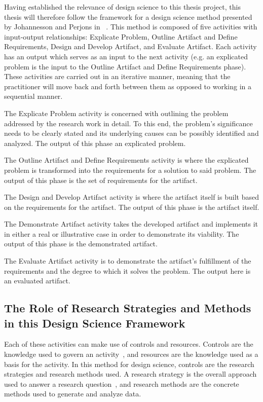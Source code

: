 Having established the relevance of design science to this thesis project, this thesis will therefore follow the framework for a design science method presented by Johannesson and Perjons in ~\cite[Ch. 4]{johannessonPerjons2012}. This method is composed of five activities with input-output relationships: Explicate Problem, Outline Artifact and Define Requirements, Design and Develop Artifact, and Evaluate Artifact. Each activity has an output which serves as an input to the next activity (e.g. an explicated problem is the input to the Outline Artifact and Define Requirements phase). These activities are carried out in an iterative manner, meaning that the practitioner will move back and forth between them as opposed to working in a sequential manner. 

The Explicate Problem activity is concerned with outlining the problem addressed by the research work in detail. To this end, the problem's significance needs to be clearly stated and its underlying causes can be possibly identified and analyzed. The output of this phase an explicated problem. 

The Outline Artifact and Define Requirements activity is where the explicated problem is transformed into the requirements for a solution to said problem. The output of this phase is the set of requirements for the artifact. 

The Design and Develop Artifact activity is where the artifact itself is built based on the requirements for the artifact. The output of this phase is the artifact itself.

The Demonstrate Artifact activity takes the developed artifact and implements it in either a real or illustrative case in order to demonstrate its viability. The output of this phase is the demonstrated artifact. 

The Evaluate Artifact activity is to demonstrate the artifact's fulfillment of the requirements and the degree to which it solves the problem. The output here is an evaluated artifact. 

\subsection{The Role of Research Strategies and Methods in this Design Science Framework}

Each of these activities can make use of controls and resources. Controls are the knowledge used to govern an activity~\cite[Ch. 4]{johannessonPerjons2012}, and  resources are the knowledge used as a basis for the activity. In this method for design science, controls are the research strategies and research methods used. A research strategy is the overall approach used to answer a research question~\cite[Ch. 3]{johannessonPerjons2012}, and research methods are the concrete methods used to generate and analyze data. 


